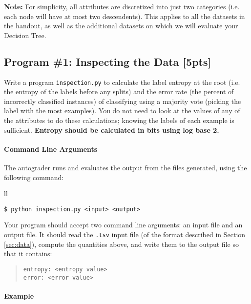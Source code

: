 \documentclass[11pt,addpoints,answers]{exam}
\begin{document}
\begin{notebox} \textbf{Note:}
For simplicity, all attributes are discretized into just two categories (i.e. each node will have at most two descendents). This applies to all the datasets in the handout, as well as the additional datasets on which we will evaluate your Decision Tree.
\end{notebox}

\newpage
\subsection{Program \#1: Inspecting the Data [5pts]}
\label{sec:inspect}

    Write a program \texttt{inspection.py} to calculate the label entropy at the root (i.e. the entropy of the labels before any splits) and the error rate (the percent of incorrectly classified instances) of classifying using a majority vote (picking the label with the most examples). You do not need to look at the values of any of the attributes to do these calculations; knowing the labels of each example is sufficient. \textbf{Entropy should be calculated in bits using log base 2.}

\paragraph{Command Line Arguments}
The autograder runs and evaluates the output from the files  generated, using the following command:

\begin{tabular}{ll}
\begin{lstlisting}[language=Shell]
$ python inspection.py <input> <output>
\end{lstlisting}
\end{tabular}

Your program should accept two command line arguments: an input file and an output file. It should read the \lstinline{.tsv} input file (of the format described in Section \ref{sec:data}), compute the quantities above, and write them to the output file so that it contains:
\begin{quote}
\begin{verbatim}
entropy: <entropy value>
error: <error value>
\end{verbatim}
\end{quote}

\paragraph{Example}
\end{document}
